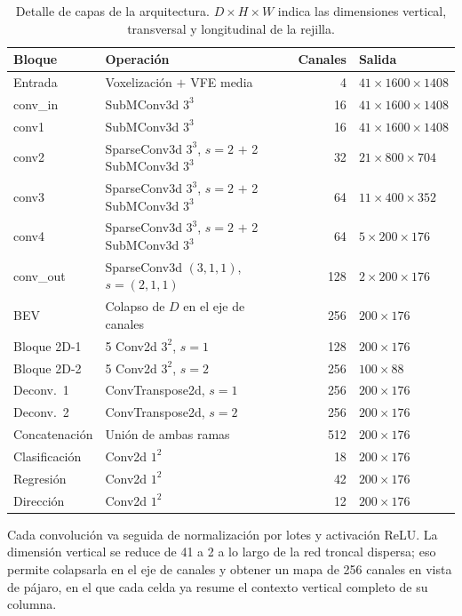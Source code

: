 \documentclass[11pt,letterpaper]{article}
\begin{document}
\begin{table}[htbp]
\caption{Detalle de capas de la arquitectura. $D \times H \times W$ indica las dimensiones vertical, transversal y longitudinal de la rejilla.}
\label{tab:capas}
\centering
\small
\renewcommand{\arraystretch}{1.1}
\begin{tabular}{@{}llrl@{}}
\toprule
\textbf{Bloque} & \textbf{Operación} & \textbf{Canales} & \textbf{Salida} \\
\midrule
Entrada & Voxelización $+$ VFE media & 4 & $41 \times 1600 \times 1408$ \\
\addlinespace[3pt]
conv\_in & SubMConv3d $3^3$ & 16 & $41 \times 1600 \times 1408$ \\
conv1 & SubMConv3d $3^3$ & 16 & $41 \times 1600 \times 1408$ \\
conv2 & SparseConv3d $3^3$, $s{=}2$ $+$ 2 SubMConv3d $3^3$ & 32 & $21 \times 800 \times 704$ \\
conv3 & SparseConv3d $3^3$, $s{=}2$ $+$ 2 SubMConv3d $3^3$ & 64 & $11 \times 400 \times 352$ \\
conv4 & SparseConv3d $3^3$, $s{=}2$ $+$ 2 SubMConv3d $3^3$ & 64 & $5 \times 200 \times 176$ \\
conv\_out & SparseConv3d $(3,1,1)$, $s{=}(2,1,1)$ & 128 & $2 \times 200 \times 176$ \\
\addlinespace[3pt]
BEV & Colapso de $D$ en el eje de canales & 256 & $200 \times 176$ \\
\addlinespace[3pt]
Bloque 2D-1 & 5 Conv2d $3^2$, $s{=}1$ & 128 & $200 \times 176$ \\
Bloque 2D-2 & 5 Conv2d $3^2$, $s{=}2$ & 256 & $100 \times 88$ \\
Deconv.\ 1 & ConvTranspose2d, $s{=}1$ & 256 & $200 \times 176$ \\
Deconv.\ 2 & ConvTranspose2d, $s{=}2$ & 256 & $200 \times 176$ \\
Concatenación & Unión de ambas ramas & 512 & $200 \times 176$ \\
\addlinespace[3pt]
Clasificación & Conv2d $1^2$ & 18 & $200 \times 176$ \\
Regresión & Conv2d $1^2$ & 42 & $200 \times 176$ \\
Dirección & Conv2d $1^2$ & 12 & $200 \times 176$ \\
\bottomrule
\end{tabular}
\end{table}

Cada convolución va seguida de normalización por lotes y activación ReLU. La dimensión vertical se reduce de 41 a 2 a lo largo de la red troncal dispersa; eso permite colapsarla en el eje de canales y obtener un mapa de 256 canales en vista de pájaro, en el que cada celda ya resume el contexto vertical completo de su columna.
\end{document}
